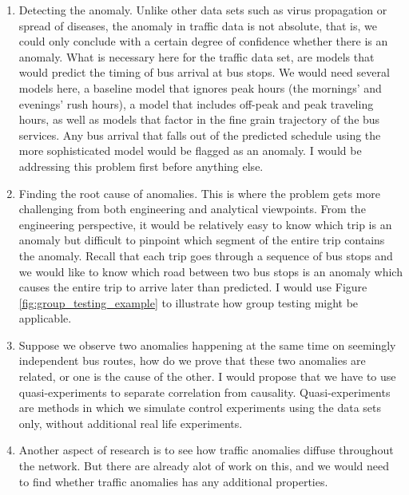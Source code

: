\documentclass[10pt]{article}
\begin{document}
\begin{enumerate}
	\item Detecting the anomaly. Unlike other data sets such as virus propagation or spread of diseases, the anomaly in traffic data is not absolute, that is, we could only conclude with a certain degree of confidence whether there is an anomaly. What is necessary here for the traffic data set, are models that would predict the timing of bus arrival at bus stops. We would need several models here, a baseline model that ignores peak hours (the mornings' and evenings' rush hours), a model that includes off-peak and peak traveling hours, as well as models that factor in the fine grain trajectory of the bus services. Any bus arrival that falls out of the predicted schedule using the more sophisticated model would be flagged as an anomaly. I would be addressing this problem first before anything else.

	\item Finding the root cause of anomalies. This is where the problem gets more challenging from both engineering and analytical viewpoints. From the engineering perspective, it would be relatively easy to know which trip is an anomaly but difficult to pinpoint which segment of the entire trip contains the anomaly. Recall that each trip goes through a sequence of bus stops and we would like to know which road between two bus stops is an anomaly which causes the entire trip to arrive later than predicted. I would use Figure \ref{fig:group_testing_example} to illustrate how group testing might be applicable. %

	\item Suppose we observe two anomalies happening at the same time on seemingly independent bus routes, how do we prove that these two anomalies are related, or one is the cause of the other. I would propose that we have to use quasi-experiments to separate correlation from causality. Quasi-experiments are methods in which we simulate control experiments using the data sets only, without additional real life experiments. 


	\item Another aspect of research is to see how traffic anomalies diffuse throughout the network. But there are already alot of work on this, and we would need to find whether traffic anomalies has any additional properties.
\end{enumerate}
\end{document}
